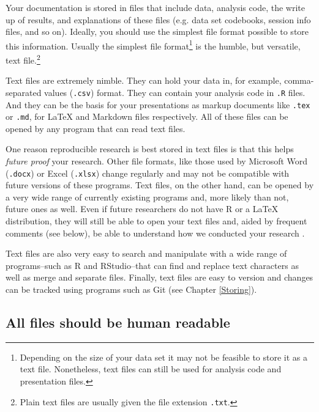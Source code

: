 Your documentation is stored in files that include data, analysis code, the write up of results, and explanations of these files (e.g. data set codebooks, session info files, and so on). Ideally, you should use the simplest file format possible to store this information. Usually the simplest file format\footnote{Depending on the size of your data set it may not be feasible to store it as a text file. Nonetheless, text files can still be used for analysis code and presentation files.}  is the humble, but versatile, text file.\footnote{Plain text files are usually given the file extension \texttt{.txt}.}

Text files are extremely nimble. They can hold your data in, for example, comma-separated values ({\tt{.csv}})  format. They can contain your analysis code in {\tt{.R}} files. And they can be the basis for your presentations as markup documents like {\tt{.tex}} or {\tt{.md}}, for LaTeX and Markdown files respectively. All of these files can be opened by any program that can read text files. 

One reason reproducible research is best stored in text files is that this helps {\emph{future proof}} your research. Other file formats, like those used by Microsoft Word  (\texttt{.docx}) or Excel (\texttt{.xlsx}) change regularly and may not be compatible with future versions of these programs. Text files, on the other hand, can be opened by a very wide range of currently existing programs and, more likely than not, future ones as well. Even if future researchers do not have R or a LaTeX distribution, they will still be able to open your text files and, aided by frequent comments (see below), be able to understand how we conducted your research \cite[3]{Bowers2011}.

Text files are also very easy to search and manipulate with a wide range of programs--such as R and RStudio--that can find and replace text characters as well as merge and separate files. Finally, text files are easy to version and changes can be tracked using programs such as Git (see Chapter \ref{Storing}).   

\subsection{All files should be human readable}

